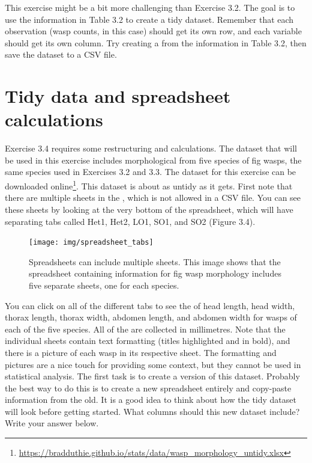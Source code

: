 \documentclass[
  openany]{krantz}
\begin{document}
This exercise might be a bit more challenging than Exercise 3.2.
The goal is to use the information in Table 3.2 to create a tidy dataset.
Remember that each observation (wasp counts, in this case) should get its own row, and each variable should get its own column.
Try creating a  from the information in Table 3.2, then save the dataset to a CSV file.

\hypertarget{tidy-data-and-spreadsheet-calculations}{%
\section{Tidy data and spreadsheet calculations}\label{tidy-data-and-spreadsheet-calculations}}

Exercise 3.4 requires some restructuring and calculations.
The dataset that will be used in this exercise includes morphological  from five species of fig wasps, the same species used in Exercises 3.2 and 3.3.
The dataset for this exercise can be downloaded online\footnote{\url{https://bradduthie.github.io/stats/data/wasp_morphology_untidy.xlsx}}.
This dataset is about as untidy as it gets.
First note that there are multiple sheets in the , which is not allowed in a CSV file.
You can see these sheets by looking at the very bottom of the spreadsheet, which will have separating tabs called Het1, Het2, LO1, SO1, and SO2 (Figure 3.4).

\begin{figure}
\texttt{[image: img/spreadsheet\_tabs]} \caption{Spreadsheets can include multiple sheets. This image shows that the spreadsheet containing information for fig wasp morphology includes five separate sheets, one for each species.}\label{fig:unnamed-chunk-20}
\end{figure}

You can click on all of the different tabs to see the  of head length, head width, thorax length, thorax width, abdomen length, and abdomen width for wasps of each of the five species.
All of the  are collected in millimetres.
Note that the individual sheets contain text formatting (titles highlighted and in bold), and there is a picture of each wasp in its respective sheet.
The formatting and pictures are a nice touch for providing some context, but they cannot be used in statistical analysis.
The first task is to create a  version of this dataset.
Probably the best way to do this is to create a new spreadsheet entirely and copy-paste information from the old.
It is a good idea to think about how the tidy dataset will look before getting started.
What columns should this new dataset include? Write your answer below.
\end{document}
